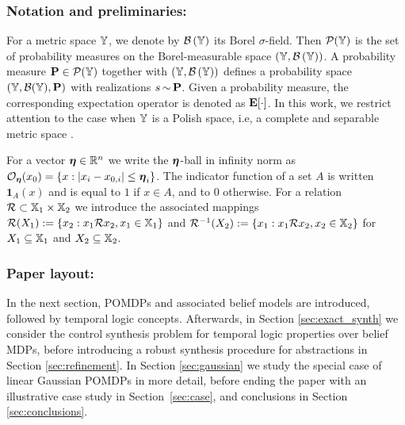\documentclass{ifacconf}
\newcommand{\ind}{\mathbf{1}}
\newcommand{\cristi}[1]{{\color{orange}#1}}
\begin{document}
\subsubsection{Notation and preliminaries:}

For a metric space ${\mathbb{Y}}$, we denote by $\mathcal{B}\left({\mathbb{Y}}\right)$ its Borel $\sigma$-field. Then $\mathcal P({\mathbb{Y}})$ is the set of probability measures on the Borel-measurable space $({\mathbb{Y}},\mathcal{B}\left({\mathbb{Y}}\right))$. A probability measure $\mathbf{P} \in \mathcal P({\mathbb{Y}})$ together with $({\mathbb{Y}},\mathcal{B}\left({\mathbb{Y}}\right))$ defines a probability space $({\mathbb{Y}},\mathcal{B}({\mathbb{Y}}),\mathbf{P})$ with realizations $s{\,\sim\,}\mathbf{P}$. Given a probability measure, the corresponding expectation operator is denoted as $\mathbf{E}[\cdot]$. In this work, we restrict attention to the case when ${\mathbb{Y}}$ is a Polish space, i.e, a complete and separable metric space \citep{bogachev2007measure}.

For a vector ${\boldsymbol{\eta}}  \in \mathbb{R}^n$ we write the ${\boldsymbol{\eta}}$-ball in infinity norm as $\mathcal{O}_{\boldsymbol{\eta}}(x_0) = \{ x : |x_i - x_{0,i}| \leq {\boldsymbol{\eta}}_i \}$. The indicator function of a set $A$ is written $\ind_A(x)$ and is equal to $1$ if $x \in A$, and to 0 otherwise. For a relation $\mathcal{R} \subset {\mathbb{X}}_1 \times {\mathbb{X}}_2$ we introduce the associated mappings $\mathcal{R}(X_1):=\{x_2: x_1\mathcal{R} x_2, x_1 \in {\mathbb{X}}_1\}$ and  $\mathcal{R}^{-1}( X_2 ):=\{x_1: x_1\mathcal{R} x_2, x_2 \in {\mathbb{X}}_2 \}$ for $X_1 \subseteq {\mathbb{X}}_1$ and $X_2 \subseteq {\mathbb{X}}_2$.


\subsubsection{Paper layout:}

In the next section, POMDPs and associated belief models are introduced, followed by temporal logic concepts. Afterwards, in Section \ref{sec:exact_synth} we consider the control synthesis problem for temporal logic properties over belief MDPs, before introducing %
 a robust synthesis procedure for abstractions in Section \ref{sec:refinement}. In Section \ref{sec:gaussian} we study the special case of linear Gaussian POMDPs in more detail, before ending the paper with an illustrative case study in Section~\ref{sec:case}, and conclusions in Section \ref{sec:conclusions}.
\end{document}
